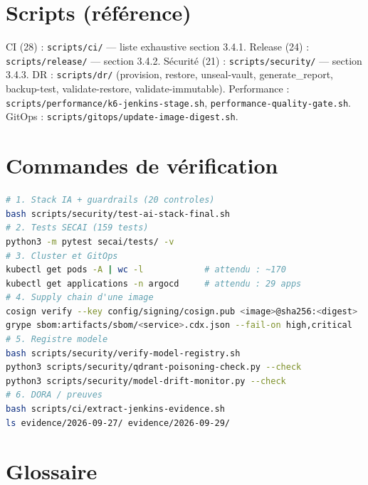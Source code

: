 \documentclass[12pt,a4paper,openany]{report}
\begin{document}
\chapter{Scripts (référence)}
\label{annex:scripts}

CI (28) : \texttt{scripts/ci/} — liste exhaustive section 3.4.1.
Release (24) : \texttt{scripts/release/} — section 3.4.2.
Sécurité (21) : \texttt{scripts/security/} — section 3.4.3.
DR : \texttt{scripts/dr/} (provision, restore, unseal-vault, generate\_report, backup-test, validate-restore, validate-immutable).
Performance : \texttt{scripts/performance/k6-jenkins-stage.sh}, \texttt{performance-quality-gate.sh}.
GitOps : \texttt{scripts/gitops/update-image-digest.sh}.

\chapter{Commandes de vérification}
\label{annex:commandes}

\begin{lstlisting}[language=bash,caption={Vérification de bout en bout (à exécuter dans l'ordre)},label={lst:verif}]
# 1. Stack IA + guardrails (20 controles)
bash scripts/security/test-ai-stack-final.sh
# 2. Tests SECAI (159 tests)
python3 -m pytest secai/tests/ -v
# 3. Cluster et GitOps
kubectl get pods -A | wc -l            # attendu : ~170
kubectl get applications -n argocd     # attendu : 29 apps
# 4. Supply chain d'une image
cosign verify --key config/signing/cosign.pub <image>@sha256:<digest>
grype sbom:artifacts/sbom/<service>.cdx.json --fail-on high,critical
# 5. Registre modele
bash scripts/security/verify-model-registry.sh
python3 scripts/security/qdrant-poisoning-check.py --check
python3 scripts/security/model-drift-monitor.py --check
# 6. DORA / preuves
bash scripts/ci/extract-jenkins-evidence.sh
ls evidence/2026-09-27/ evidence/2026-09-29/
\end{lstlisting}

\chapter{Glossaire}
\label{annex:glossaire}
\end{document}
